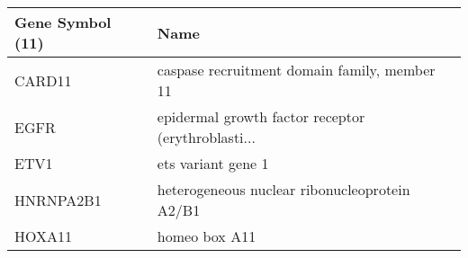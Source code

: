 \begin{tabular}{ll}
\toprule
Gene Symbol (11) &                                               Name \\
\midrule
          CARD11 &       caspase recruitment domain family, member 11 \\
            EGFR & epidermal growth factor receptor (erythroblasti... \\
            ETV1 &                                 ets variant gene 1 \\
       HNRNPA2B1 &      heterogeneous nuclear ribonucleoprotein A2/B1 \\
          HOXA11 &                                      homeo box A11 \\
\bottomrule
\end{tabular}
